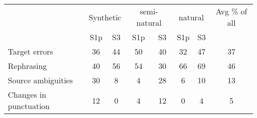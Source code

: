 \begin{tabular}{lccccccc}
 & \multicolumn{2}{c}{Synthetic} & \multicolumn{2}{c}{semi-natural} & \multicolumn{2}{c}{natural} & Avg \% of all \\
& S1p & S3 & S1p & S3 & S1p & S3 & \\\hline
Target errors & 36 & 44 & 50 & 40 & 32 & 47 & 37\\
Rephrasing & 40 & 56 & 54 & 30 & 66 & 69 & 46\\
Source ambiguities & 30 & 8 & 4 & 28 & 6 & 10 & 13\\
Changes in punctuation & 12 & 0 & 4 & 12 & 0 & 4 & 5\\
\end{tabular}